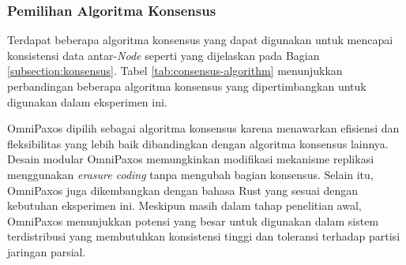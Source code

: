 \subsubsection{Pemilihan Algoritma Konsensus}
\label{subsubsection:pemilihan-algoritma-konsensus}

Terdapat beberapa algoritma konsensus yang dapat digunakan untuk mencapai konsistensi data antar-\textit{Node} seperti yang dijelaskan pada Bagian \ref{subsection:konsensus}. Tabel \ref{tab:consensus-algorithm} menunjukkan perbandingan beberapa algoritma konsensus yang dipertimbangkan untuk digunakan dalam eksperimen ini.

\begin{table}[ht]
    \centering
    \caption{Perbandingan Algoritma Konsensus}
    \label{tab:consensus-algorithm}
\end{table}

OmniPaxos dipilih sebagai algoritma konsensus karena menawarkan efisiensi dan fleksibilitas yang lebih baik dibandingkan dengan algoritma konsensus lainnya. Desain modular OmniPaxos memungkinkan modifikasi mekanisme replikasi menggunakan \textit{erasure coding} tanpa mengubah bagian konsensus. Selain itu, OmniPaxos juga dikembangkan dengan bahasa Rust yang sesuai dengan kebutuhan eksperimen ini. Meskipun masih dalam tahap penelitian awal, OmniPaxos menunjukkan potensi yang besar untuk digunakan dalam sistem terdistribusi yang membutuhkan konsistensi tinggi dan toleransi terhadap partisi jaringan parsial.

